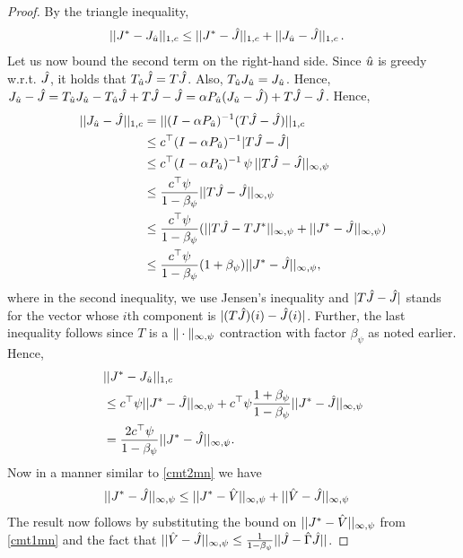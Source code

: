 \begin{proof}
By the triangle inequality,
\begin{align*}
||J^*-J_{\hat{u}}||_{1,c}&\leq ||J^*-\hat{J}||_{1,c}+||J_{\hat{u}}-\hat{J}||_{1,c}\,.
\end{align*}
Let us now bound the second term on the right-hand side.
Since $\hat{u}$ is greedy w.r.t. $\hat{J}$, it holds that $T_{\hat{u}} \hat{J} = T \hat{J}$.
Also, $T_{\hat{u}} J_{\hat{u}} = J_{\hat{u}}$.
Hence, $J_{\hat{u}} - \hat{J} = T_{\hat{u}} J_{\hat{u}} - T_{\hat{u}} \hat{J} + T \hat{J} - \hat{J}
=\alpha P_{\hat{u}} (J_{\hat{u}}- \hat{J}) + T\hat{J} - \hat{J}$.
Hence,
\begin{align}\label{polderv}
||J_{\hu}-\hj||_{1,c}\nn
&=||(I-\alpha P_{\hu})^{-1}(T\hj-\hj)||_{1,c}\nn\\
&\leq c^\top(I-\alpha P_{\hu})^{-1}|T\hj-\hj|\nn\\
&\leq c^\top (I-\alpha P_{\hu})^{-1} \,\psi\, ||T\hj-\hj||_{\mn}\nn\\
&\leq \frac{c^\top \psi}{1-\beta_{\psi}}||T\hj-\hj||_{\mn}\nn\\
&\leq \frac{c^\top \psi}{1-\beta_{\psi}}(||T\hj-TJ^*||_{\mn} +||J^*- \hj||_{\mn})\nn\\
&\leq \frac{c^\top \psi}{1-\beta_{\psi}}(1+\beta_{\psi})||J^*- \hj||_{\mn},
\end{align}
where in the second inequality, we use Jensen's inequality and $|T\hat{J} - \hat{J}|$ stands for the 
vector whose $i$th component is $|(T\hat{J})(i) - \hat{J}(i)|$. Further, the last inequality follows
since $T$ is a $\|\cdot\|_{\infty,\psi}$ contraction with factor $\beta_{\psi}$ as noted earlier.
Hence,
\begin{align}
&||J^*-J_{\hat{u}}||_{1,c}\nonumber\\
&\leq c^\top \psi ||J^*-\hat{J}||_{\infty,\psi}+c^\top \psi\frac{1+\beta_\psi}{1-\beta_\psi}||J^*- \hat{J}||_{\infty,\psi}\nonumber\\
&=\frac{2c^\top \psi}{1-\beta_{\psi}}||J^*- \hat{J}||_{\infty,\psi}.
\end{align}
Now in a manner similar to \cref{cmt2mn} we have
\begin{align}
||J^*- \hat{J}||_{\infty,\psi}&\leq ||J^*- \hat{V}||_{\infty,\psi}+||\hat{V} -\hat{J}||_{\infty,\psi}\nonumber
\end{align}
The result now follows by substituting the bound on $||J^*- \hat{V}||_{\infty,\psi}$ from \cref{cmt1mn} and the fact that $||\hat{V}-\hat{J}||_{\infty,\psi}\leq \frac{1}{1-\beta_{\psi}}||\hat{J}-\hat{\Gamma}\hat{J}||$.
\end{proof}
